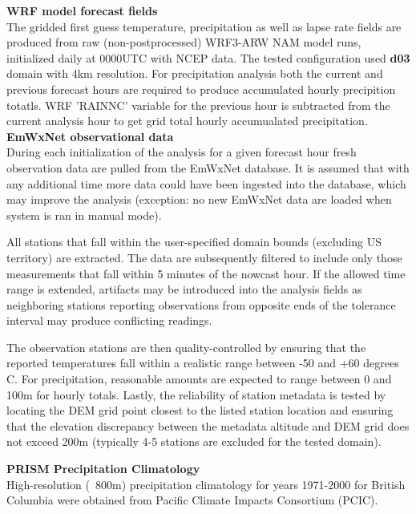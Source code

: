 \documentclass{article}
\begin{document}
\vspace{0.1cm}
\noindent \textbf{WRF model forecast fields}\\
The gridded first guess temperature, precipitation as well as lapse rate fields are produced from raw (non-postprocessed) WRF3-ARW NAM model runs, initialized daily at 0000UTC with NCEP data. The tested configuration used \textbf{d03} domain with 4km resolution. For precipitation analysis both the current and previous forecast hours are required to produce accumulated hourly precipition totatls. WRF 'RAINNC' variable for the previous hour is subtracted from the current analysis hour to get grid total hourly accumualated precipitation. \\

\vspace{0.1cm}
\noindent \textbf{EmWxNet observational data}\\
During each initialization of the analysis for a given forecast hour fresh observation data are pulled from the EmWxNet database. It is assumed that with any additional time more data could have been ingested into the database, which may improve the analysis (exception: no new EmWxNet data are loaded when system is ran in manual mode). 

All stations that fall within the user-specified domain bounds (excluding US territory) are extracted. The data are subsequently filtered to include only those measurements that fall within 5 minutes of the nowcast hour. If the allowed time range is extended, artifacts may be introduced into the analysis fields as neighboring stations reporting observations from opposite ends of the tolerance interval may produce conflicting readings. 

The observation stations are then quality-controlled by ensuring that the reported temperatures fall within a realistic range between -50 and +60 degrees C. For precipitation, reasonable amounts are expected to range between 0 and 100m for hourly totals. Lastly, the reliability of station metadata is tested by locating the DEM grid point closest to the listed station location and ensuring that the elevation discrepancy between the metadata altitude and DEM grid does not exceed 200m (typically 4-5 stations are excluded for the tested domain). 


\vspace{0.1cm}
\noindent \textbf{PRISM Precipitation Climatology}\\
High-resolution (~800m) precipitation climatology for years 1971-2000 for British Columbia were obtained from Pacific Climate Impacts Consortium (PCIC). 
\end{document}
